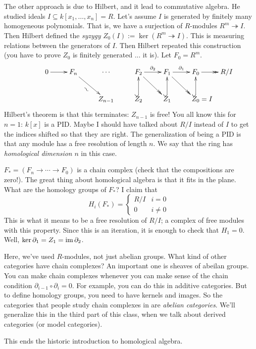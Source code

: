 The other approach is due to Hilbert, and it lead to commutative algebra. He studied ideals $I\subseteq k[x_1,\dots, x_n]=R$. Let's assume $I$ is generated by finitely many homogeneous polynomials. That is, we have a surjection of $R$-modules $R^m\twoheadrightarrow I$. Then Hilbert defined the \emph{syzygy} $Z_0(I):=\ker(R^m\twoheadrightarrow I)$. This is measuring relations between the generators of $I$. Then Hilbert repeated this construction (you have to prove $Z_0$ is finitely generated ... it is). Let $F_0=R^m$.
\[\xymatrix{
 & 0\ar[r] & F_n \ar[dr]_@{~} &\cdots & F_2\ar@{->>}[dr]\ar[r]^{\partial_2} & F_1\ar@{->>}[dr] \ar[r]^{\partial_1}& F_0\ar@{->>}[r] & R/I\\
 &&& Z_{n-1} & Z_2\ar@{^(->}[u] & Z_1\ar@{^(->}[u] & Z_0\rlap{$\;=I$}\ar@{^(->}[u]
}\]
Hilbert's theorem is that this terminates: $Z_{n-1}$ is free! You all know this for $n=1$: $k[x]$ is a PID. Maybe I should have talked about $R/I$ instead of $I$ to get the indices shifted so that they are right. The generalization of being a PID is that any module has a free resolution of length $n$. We say that the ring has \emph{homological dimension $n$} in this case.

$F_*=(F_n\to \cdots \to F_0)$ is a chain complex (check that the compositions are zero!). The great thing about homological algebra is that it fits in the plane. What are the homology groups of $F_*$? I claim that
\[
 H_i(F_*)=\begin{cases}
  R/I & i=0\\
  0 & i\neq 0
 \end{cases}
\]
This is what it means to be a free resolution of $R/I$; a complex of free modules with this property. Since this is an iteration, it is enough to check that $H_1=0$. Well, $\ker \partial_1=Z_1=\operatorname{im} \partial_2$.

Here, we've used $R$-modules, not just abelian groups. What kind of other categories have chain complexes? An important one is sheaves of abeilan groups. You can make chain complexes whenever you can make sense of the chain condition $\partial_{i-1}\circ \partial_i=0$. For example, you can do this in additive categories. But to define homology groups, you need to have kernels and images. So the categories that people study chain complexes in are \emph{abelian categories}. We'll generalize this in the third part of this class, when we talk about derived categories (or model categories).

This ends the historic introduction to homological algebra.

